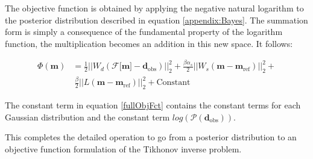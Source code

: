 \documentclass[extra]{gji} %
\begin{document}
The objective function is obtained by applying the negative natural logarithm to the posterior distribution described in equation \ref{appendix:Bayes}. The summation form is simply a consequence of the fundamental property of the logarithm function, the multiplication becomes an addition in this new space. It follows:

\begin{align}
\Phi(\mathbf{m}) &= \frac{1}{2}||W_d(\mathcal{F}\lbrack\mathbf{m}\rbrack-\mathbf{d}_{\text{obs}})||_2^2 + \frac{\beta\alpha_s}{2}||W_s(\mathbf{m}-\mathbf{m}_{{\text{ref}}})||_2^2 + \nonumber\\  &~\frac{\beta}{2}||L(\mathbf{m}-\mathbf{m}_{{\text{ref}}})||_2^2 +\text{Constant} \label{fullObjFct}
\end{align}

The constant term in equation \ref{fullObjFct} contains the constant terms for each Gaussian distribution and the constant term $log(\mathcal{P}(\mathbf{d}_{\text{obs}}))$.

This completes the detailed operation to go from a posterior distribution to an objective function formulation of the Tikhonov inverse problem.



\end{document}
